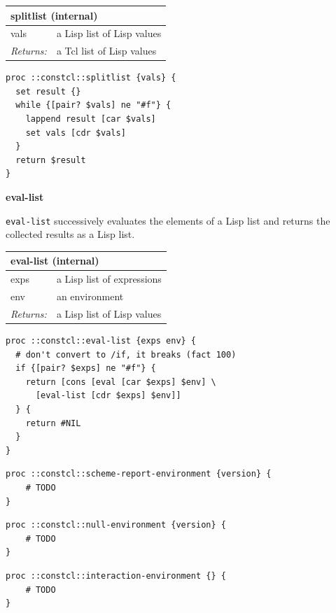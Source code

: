 \documentclass[twoside,9pt]{report}
\begin{document}
\begin{tabular}{ |l l| }
\hline
\multicolumn{2}{|l|}{splitlist (internal)} \\
\hline
vals & a Lisp list of Lisp values \\
\textit{Returns:} & a Tcl list of Lisp values \\
\hline
\end{tabular}

\noindent\makebox[\linewidth]{\rule{\linewidth}{0.4pt}}
\begin{lstlisting}
proc ::constcl::splitlist {vals} {
  set result {}
  while {[pair? $vals] ne "#f"} {
    lappend result [car $vals]
    set vals [cdr $vals]
  }
  return $result
}
\end{lstlisting}
\noindent\makebox[\linewidth]{\rule{\linewidth}{0.4pt}}

\textbf{eval-list}


\texttt{eval-list} successively evaluates the elements of a Lisp list and returns the collected results as a Lisp list.

\begin{tabular}{ |l l| }
\hline
\multicolumn{2}{|l|}{eval-list (internal)} \\
\hline
exps & a Lisp list of expressions \\
env & an environment \\
\textit{Returns:} & a Lisp list of Lisp values \\
\hline
\end{tabular}

\noindent\makebox[\linewidth]{\rule{\linewidth}{0.4pt}}
\begin{lstlisting}
proc ::constcl::eval-list {exps env} {
  # don't convert to /if, it breaks (fact 100)
  if {[pair? $exps] ne "#f"} {
    return [cons [eval [car $exps] $env] \
      [eval-list [cdr $exps] $env]]
  } {
    return #NIL
  }
}
\end{lstlisting}
\noindent\makebox[\linewidth]{\rule{\linewidth}{0.4pt}}
\noindent\makebox[\linewidth]{\rule{\linewidth}{0.4pt}}
\begin{lstlisting}
proc ::constcl::scheme-report-environment {version} {
    # TODO
}
\end{lstlisting}
\noindent\makebox[\linewidth]{\rule{\linewidth}{0.4pt}}
\noindent\makebox[\linewidth]{\rule{\linewidth}{0.4pt}}
\begin{lstlisting}
proc ::constcl::null-environment {version} {
    # TODO
}
\end{lstlisting}
\noindent\makebox[\linewidth]{\rule{\linewidth}{0.4pt}}
\noindent\makebox[\linewidth]{\rule{\linewidth}{0.4pt}}
\begin{lstlisting}
proc ::constcl::interaction-environment {} {
    # TODO
}
\end{lstlisting}
\noindent\makebox[\linewidth]{\rule{\linewidth}{0.4pt}}
\end{document}

